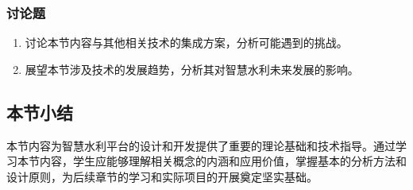 \subsubsection{讨论题}\label{ux8ba8ux8bbaux9898-3} \begin{enumerate} \def\labelenumi{\arabic{enumi}.} \tightlist \item
讨论本节内容与其他相关技术的集成方案，分析可能遇到的挑战。 \item 展望本节涉及技术的发展趋势，分析其对智慧水利未来发展的影响。 \end{enumerate}
\subsection{本节小结}\label{ux672cux8282ux5c0fux7ed3-3}
本节内容为智慧水利平台的设计和开发提供了重要的理论基础和技术指导。通过学习本节内容，学生应能够理解相关概念的内涵和应用价值，掌握基本的分析方法和设计原则，为后续章节的学习和实际项目的开展奠定坚实基础。
